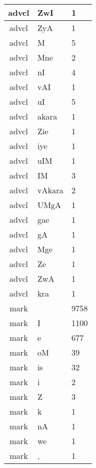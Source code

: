 \documentclass[a4 paper]{article}
\begin{document}
\begin{longtable}{cp{}p{}}
\\ \midrule advcl & ZwI & 1\\ \midrule advcl & ZyA & 1\\ \midrule advcl & M & 5\\ \midrule advcl & Mne & 2\\ \midrule advcl & nI & 4\\ \midrule advcl & vAI & 1\\ \midrule advcl & uI & 5\\ \midrule advcl & akara & 1\\ \midrule advcl & Zie & 1\\ \midrule advcl & iye & 1\\ \midrule advcl & uIM & 1\\ \midrule advcl & IM & 3\\ \midrule advcl & vAkara & 2\\ \midrule advcl & UMgA & 1\\ \midrule advcl & gae & 1\\ \midrule advcl & gA & 1\\ \midrule advcl & Mge & 1\\ \midrule advcl & Ze & 1\\ \midrule advcl & ZwA & 1\\ \midrule advcl & kra & 1\\ \midrule 
mark &  & 9758\\ \midrule mark & I & 1100\\ \midrule mark & e & 677\\ \midrule mark & oM & 39\\ \midrule mark & is & 32\\ \midrule mark & i & 2\\ \midrule mark & Z & 3\\ \midrule mark & k & 1\\ \midrule mark & nA & 1\\ \midrule mark & we & 1\\ \midrule mark & , & 1\\ \midrule 

\end{longtable}
\end{document}
